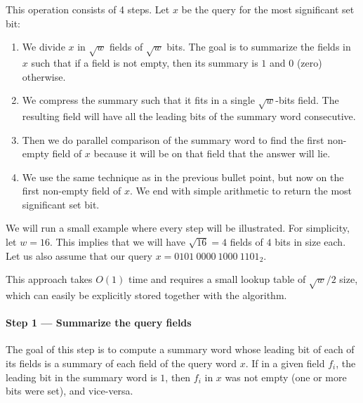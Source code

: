 This operation consists of 4 steps. Let $x$ be the query for the most significant set bit:
\begin{enumerate}
    \item
    We divide $x$ in $\sqrt{w}$ fields of $\sqrt{w}$ bits. The goal is to summarize the fields in $x$ such that if a field is not empty, then its summary is $1$ and $0$ (zero) otherwise.
    \item
    We compress the summary such that it fits in a single $\sqrt{w}$-bits field. The resulting field will have all the leading bits of the summary word consecutive.
    \item
    Then we do parallel comparison of the summary word to find the first non-empty field of $x$ because it will be on that field that the answer will lie.
    \item
    We use the same technique as in the previous bullet point, but now on the first non-empty field of $x$. We end with simple arithmetic to return the most significant set bit. 
\end{enumerate}

We will run a small example where every step will be illustrated. For simplicity, let $w=16$. This implies that we will have $\sqrt{16} = 4$ fields of $4$ bits in size each. Let us also assume that our query $x = 0101\ 0000\ 1000\ 1101_2$.

This approach takes $O(1)$ time and requires a small lookup table of $\sqrt{w}/2$ size, which can easily be explicitly stored together with the algorithm.

\paragraph{Step 1 --- Summarize the query fields} \label{sec:summaryfields}

The goal of this step is to compute a summary word whose leading bit of each of its fields is a summary of each field of the query word $x$. If in a given field $f_i$, the leading bit in the summary word is $1$, then $f_i$ in $x$ was not empty (one or more bits were set), and vice-versa.

